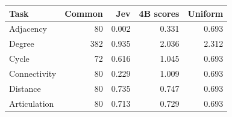 \begin{tabular}{lrrrr}
\toprule
Task & Common & Jev & 4B scores & Uniform \\
\midrule
Adjacency & 80 & 0.002 & 0.331 & 0.693 \\
Degree & 382 & 0.935 & 2.036 & 2.312 \\
Cycle & 72 & 0.616 & 1.045 & 0.693 \\
Connectivity & 80 & 0.229 & 1.009 & 0.693 \\
Distance & 80 & 0.735 & 0.747 & 0.693 \\
Articulation & 80 & 0.713 & 0.729 & 0.693 \\
\bottomrule
\end{tabular}
